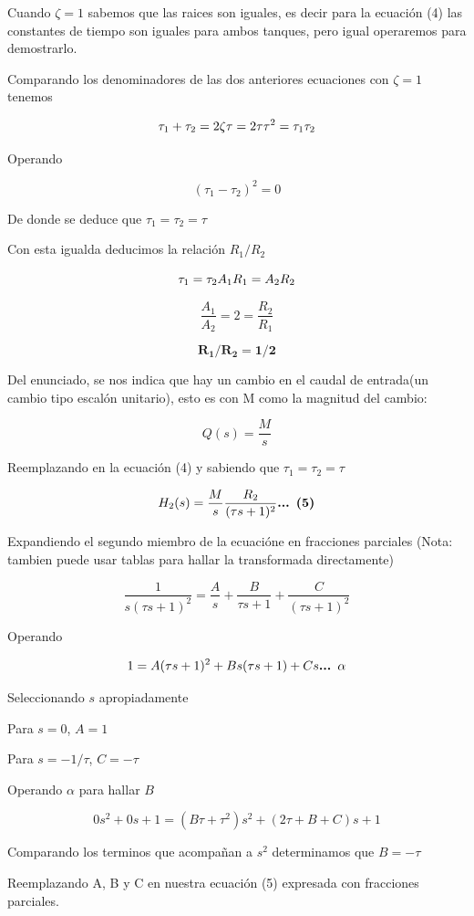 \documentclass[
  letterpaper,
  DIV=11,
  numbers=noendperiod]{scrreprt}
\begin{document}
Cuando \(\zeta=1\) sabemos que las raices son iguales, es decir para la
ecuación (4) las constantes de tiempo son iguales para ambos tanques,
pero igual operaremos para demostrarlo.

Comparando los denominadores de las dos anteriores ecuaciones con
\(\zeta=1\) tenemos

\[
\tau_1+\tau_2=2\zeta\tau=2\tau\\
\tau^2=\tau_1\tau_2
\]

Operando

\[
(\tau_1-\tau_2)^2=0
\]

De donde se deduce que \(\tau_1=\tau_2=\tau\)

Con esta igualda deducimos la relación \(R_1/R_2\)

\[
\tau_1=\tau_2\\
A_1R_1=A_2R_2
\]

\[
\frac{A_1}{A_2}=2=\frac{R_2}{R_1}
\]

\[
\mathbf{R_1/R_2=1/2}
\]

Del enunciado, se nos indica que hay un cambio en el caudal de
entrada(un cambio tipo escalón unitario), esto es con M como la magnitud
del cambio:

\[
Q(s)=\frac{M}{s}
\]

Reemplazando en la ecuación (4) y sabiendo que \(\tau_1=\tau_2=\tau\)

\[
H_2(s)=\frac{M}{s}\frac{R_2}{(\tau s+1)^2}\space\space\space\space\textbf{... (5)}
\]

Expandiendo el segundo miembro de la ecuacióne en fracciones parciales
(Nota: tambien puede usar tablas para hallar la transformada
directamente)

\[
\frac{1}{s(\tau s+1)^2}=\frac{A}{s}+\frac{B}{\tau s+1}+\frac{C}{(\tau s+1)^2}
\]

Operando

\[
1=A(\tau s+1)^2+Bs(\tau s+1)+Cs\space\space\space\space\textbf{... }\mathbf{\alpha}
\]

Seleccionando \(s\) apropiadamente

Para \(s = 0\), \(A =1\)

Para \(s=-1/\tau\), \(C=-\tau\)

Operando \(\alpha\) para hallar \(B\)

\[
0s^2+0s+1=(B\tau+\tau^2)s^2+(2\tau+B+C)s+1
\]

Comparando los terminos que acompañan a \(s^2\) determinamos que
\(B=-\tau\)

Reemplazando A, B y C en nuestra ecuación (5) expresada con fracciones
parciales.
\end{document}

